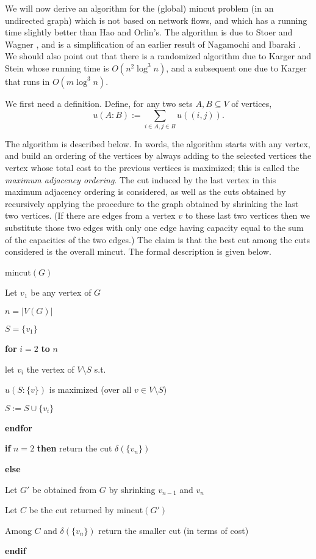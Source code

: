\documentclass[12pt]{article}
\begin{document}
We will now derive an algorithm for the (global) mincut problem (in an undirected graph)
which is not based on network flows, and which has a running time
slightly better than Hao and Orlin's. The algorithm is due to Stoer
and Wagner \cite{StoerW94}, and is a simplification of an earlier
result of Nagamochi and Ibaraki \cite{NagamochiI92}. We should also
point out that there is a randomized algorithm due to Karger and Stein
\cite{KargerS93} whose running time is $O(n^2\log^3 n)$, and a
subsequent one due to Karger \cite{Karger96} that runs in $O(m\log^3 n)$.

We first need a definition.
Define, for any two sets $A,B\subseteq V $ of vertices,
\[
u(A:B) := \sum_{i\in A, j\in B} u((i,j)).
\]

The algorithm is described below. In words, the algorithm starts with
any vertex, and build an ordering of the vertices by always adding to
the selected vertices the vertex whose total cost to the previous
vertices is maximized; this is called the {\it maximum adjacency ordering}. The cut induced by the last vertex in this maximum adjacency
ordering is considered, as well as the cuts obtained by recursively
applying the procedure to the graph obtained by shrinking the last two
vertices. (If there are edges from a vertex $v$ to these last two
vertices then we substitute those two edges with only one edge having
capacity equal to the sum of the capacities of the two edges.) The
claim is that the best cut among the cuts considered is the overall
mincut. The formal description is given below.

\begin{center}
\begin{minipage}{11cm}
\medskip
{\sc mincut}$(G)$
\begin{pseudocode}
\item Let $v_1$ be any vertex of $G$
\item $n=|V(G)|$
\item $S=\{v_1\}$
\item {\bf for} $i=2$ {\bf to} $n$
\begin{pseudocode}
\item let $v_i$ the vertex of $V\setminus S$ s.t.
\item $u(S:\{v\})$ is maximized (over all $v\in V\setminus S$)
\item $S:=S\cup\{v_i\}$
\end{pseudocode}
\item {\bf endfor}
\item {\bf if} $n=2$ {\bf then} return the cut $\delta(\{v_n\})$ 
\item {\bf else} 
\begin{pseudocode}
\item Let $G'$ be obtained from $G$ by shrinking $v_{n-1}$ and $v_n$
\item Let $C$ be the cut returned by {\sc mincut}$(G')$
\item Among $C$ and $\delta(\{v_n\})$ return the smaller cut (in terms
of cost)
\end{pseudocode}
\item {\bf endif}
\end{pseudocode}
\end{minipage}
\end{center}
\end{document}
